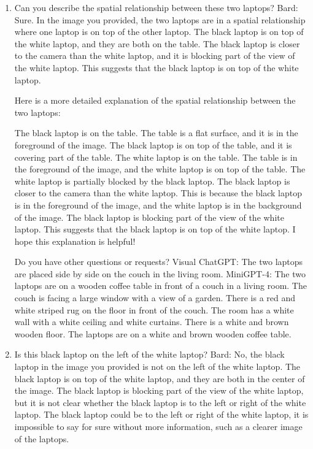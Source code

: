 \begin{enumerate}
    \item Can you describe the spatial relationship between these two laptops?
    \subitem Bard: Sure. In the image you provided, the two laptops are in a spatial relationship where one laptop is on top of the other laptop. The black laptop is on top of the white laptop, and they are both on the table. The black laptop is closer to the camera than the white laptop, and it is blocking part of the view of the white laptop. This suggests that the black laptop is on top of the white laptop.

    Here is a more detailed explanation of the spatial relationship between the two laptops:
    
    The black laptop is on the table. The table is a flat surface, and it is in the foreground of the image. The black laptop is on top of the table, and it is covering part of the table.
    The white laptop is on the table. The table is in the foreground of the image, and the white laptop is on top of the table. The white laptop is partially blocked by the black laptop.
    The black laptop is closer to the camera than the white laptop. This is because the black laptop is in the foreground of the image, and the white laptop is in the background of the image.
    The black laptop is blocking part of the view of the white laptop. This suggests that the black laptop is on top of the white laptop.
    I hope this explanation is helpful!
    
    Do you have other questions or requests?
    \subitem Visual ChatGPT: The two laptops are placed side by side on the couch in the living room.
    \subitem MiniGPT-4: The two laptops are on a wooden coffee table in front of a couch in a living room. The couch is facing a large window with a view of a garden. There is a red and white striped rug on the floor in front of the couch. The room has a white wall with a white ceiling and white curtains. There is a white and brown wooden floor. The laptops are on a white and brown wooden coffee table.
    \item Is this black laptop on the left of the white laptop?
    \subitem Bard: No, the black laptop in the image you provided is not on the left of the white laptop. The black laptop is on top of the white laptop, and they are both in the center of the image. The black laptop is blocking part of the view of the white laptop, but it is not clear whether the black laptop is to the left or right of the white laptop. The black laptop could be to the left or right of the white laptop, it is impossible to say for sure without more information, such as a clearer image of the laptops.


\end{enumerate}
